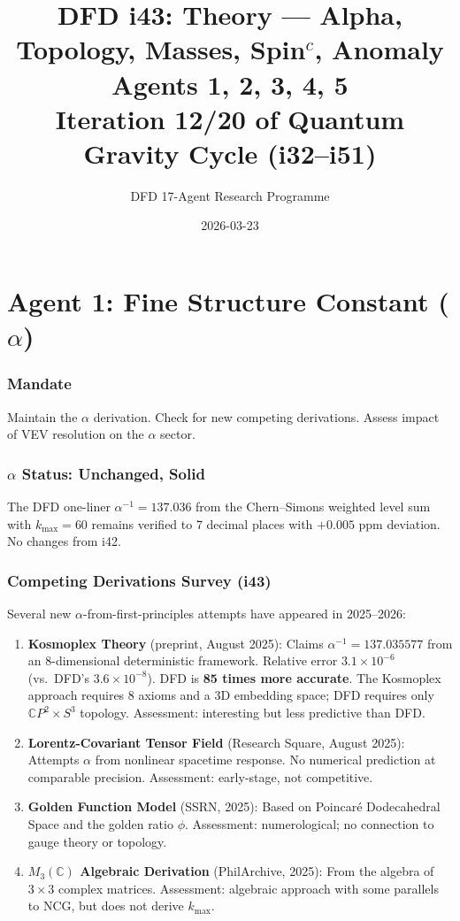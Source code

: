\documentclass[11pt,a4paper]{article}
\title{DFD i43: Theory --- Alpha, Topology, Masses, Spin$^c$, Anomaly\\[6pt]
\large Agents 1, 2, 3, 4, 5\\[6pt]
\normalsize Iteration 12/20 of Quantum Gravity Cycle (i32--i51)}
\author{DFD 17-Agent Research Programme}
\date{2026-03-23}
\newcommand{\CP}{\mathbb{C}P}
\begin{document}
\maketitle
\tableofcontents
\newpage

\part{Agent 1: Fine Structure Constant ($\alpha$)}
\label{part:agent1}

\section{Mandate}

Maintain the $\alpha$ derivation. Check for new competing derivations. Assess impact of VEV resolution on the $\alpha$ sector.

\section{$\alpha$ Status: Unchanged, Solid}

The DFD one-liner $\alpha^{-1} = 137.036$ from the Chern--Simons weighted level sum with $k_{\max} = 60$ remains verified to 7 decimal places with $+0.005$ ppm deviation. No changes from i42.

\section{Competing Derivations Survey (i43)}

Several new $\alpha$-from-first-principles attempts have appeared in 2025--2026:

\begin{enumerate}
\item \textbf{Kosmoplex Theory} (preprint, August 2025): Claims $\alpha^{-1} = 137.035577$ from an 8-dimensional deterministic framework. Relative error $3.1 \times 10^{-6}$ (vs.\ DFD's $3.6 \times 10^{-8}$). DFD is \textbf{85 times more accurate}. The Kosmoplex approach requires 8 axioms and a 3D embedding space; DFD requires only $\CP^2 \times S^3$ topology. Assessment: interesting but less predictive than DFD.

\item \textbf{Lorentz-Covariant Tensor Field} (Research Square, August 2025): Attempts $\alpha$ from nonlinear spacetime response. No numerical prediction at comparable precision. Assessment: early-stage, not competitive.

\item \textbf{Golden Function Model} (SSRN, 2025): Based on Poincar\'e Dodecahedral Space and the golden ratio $\phi$. Assessment: numerological; no connection to gauge theory or topology.

\item \textbf{$M_3(\mathbb{C})$ Algebraic Derivation} (PhilArchive, 2025): From the algebra of $3 \times 3$ complex matrices. Assessment: algebraic approach with some parallels to NCG, but does not derive $k_{\max}$.
\end{enumerate}
\end{document}
